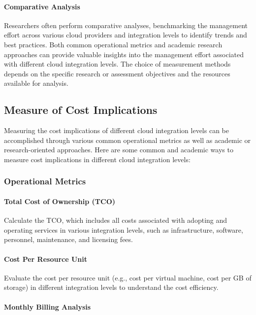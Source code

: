 \paragraph{Comparative Analysis}
Researchers often perform comparative analyses, benchmarking the management effort across various cloud providers and 
integration levels to identify trends and best practices.
Both common operational metrics and academic research approaches can provide valuable insights into the management effort associated 
with different cloud integration levels. 
The choice of measurement methods depends on the specific research or 
assessment objectives and the resources available for analysis.


\subsection{Measure of Cost Implications}
Measuring the cost implications of different cloud integration levels can be accomplished through various common operational metrics as 
well as academic or research-oriented approaches. 
Here are some common and academic ways to measure cost implications in different cloud integration levels:

\subsubsection{Operational Metrics}

\paragraph{Total Cost of Ownership (TCO)}

Calculate the TCO, which includes all costs associated with adopting and operating services in various integration levels, 
such as infrastructure, software, personnel, maintenance, and licensing fees.

\paragraph{Cost Per Resource Unit}

Evaluate the cost per resource unit (e.g., cost per virtual machine, cost per GB of storage) in different integration levels to understand the cost efficiency.


\paragraph{Monthly Billing Analysis}


